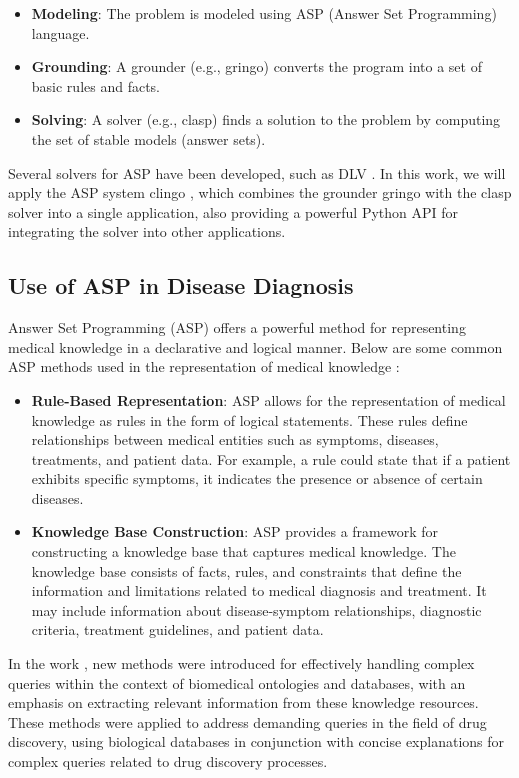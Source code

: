 \documentclass[10pt,leqno]{amsart}
\begin{document}
\begin{itemize}
    \item \textbf{Modeling}: The problem is modeled using ASP (Answer Set Programming) language.
    \item \textbf{Grounding}: A grounder (e.g., gringo) converts the program into a set of basic rules and facts.
    \item \textbf{Solving}: A solver (e.g., clasp) finds a solution to the problem by computing the set of stable models (answer sets).
\end{itemize}

Several solvers for ASP have been developed, such as DLV \cite{Xia2020}. In this work, we will apply the ASP system clingo \cite{Gebser2014}, which combines the grounder gringo with the clasp solver \cite{Holldobler2014} into a single application, also providing a powerful Python API for integrating the solver into other applications.

\subsection{Use of ASP in Disease Diagnosis}
Answer Set Programming (ASP) offers a powerful method for representing medical knowledge in a declarative and logical manner. Below are some common ASP methods used in the representation of medical knowledge \cite{Vinarti2019}:

\begin{itemize}
    \item \textbf{Rule-Based Representation}: ASP allows for the representation of medical knowledge as rules in the form of logical statements. These rules define relationships between medical entities such as symptoms, diseases, treatments, and patient data. For example, a rule could state that if a patient exhibits specific symptoms, it indicates the presence or absence of certain diseases.
    \item \textbf{Knowledge Base Construction}: ASP provides a framework for constructing a knowledge base that captures medical knowledge. The knowledge base consists of facts, rules, and constraints that define the information and limitations related to medical diagnosis and treatment. It may include information about disease-symptom relationships, diagnostic criteria, treatment guidelines, and patient data.
\end{itemize}

In the work \cite{Erdem2011}, new methods were introduced for effectively handling complex queries within the context of biomedical ontologies and databases, with an emphasis on extracting relevant information from these knowledge resources. These methods were applied to address demanding queries in the field of drug discovery, using biological databases in conjunction with concise explanations for complex queries related to drug discovery processes.
\end{document}
